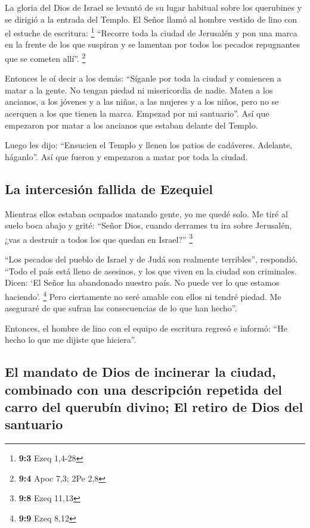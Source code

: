  La gloria del Dios de Israel se levantó de su lugar
habitual sobre los querubines y se dirigió a la entrada del Templo. El
Señor llamó al hombre vestido de lino con el estuche de escritura:
\footnote{\textbf{9:3} Ezeq 1,4-28}  ``Recorre toda la
ciudad de Jerusalén y pon una marca en la frente de los que suspiran y
se lamentan por todos los pecados repugnantes que se cometen allí''.
\footnote{\textbf{9:4} Apoc 7,3; 2Pe 2,8}

 Entonces le oí decir a los demás: ``Síganle por toda la
ciudad y comiencen a matar a la gente. No tengan piedad ni misericordia
de nadie.  Maten a los ancianos, a los jóvenes y a las
niñas, a las mujeres y a los niños, pero no se acerquen a los que tienen
la marca. Empezad por mi santuario''. Así que empezaron por matar a los
ancianos que estaban delante del Templo.

 Luego les dijo: ``Ensucien el Templo y llenen los patios
de cadáveres. Adelante, háganlo''. Así que fueron y empezaron a matar
por toda la ciudad.

\hypertarget{la-intercesiuxf3n-fallida-de-ezequiel}{%
\subsection{La intercesión fallida de
Ezequiel}\label{la-intercesiuxf3n-fallida-de-ezequiel}}

 Mientras ellos estaban ocupados matando gente, yo me
quedé solo. Me tiré al suelo boca abajo y grité: ``Señor Dios, cuando
derrames tu ira sobre Jerusalén, ¿vas a destruir a todos los que quedan
en Israel?'' \footnote{\textbf{9:8} Ezeq 11,13}

 ``Los pecados del pueblo de Israel y de Judá son
realmente terribles'', respondió. ``Todo el país está lleno de asesinos,
y los que viven en la ciudad son criminales. Dicen: `El Señor ha
abandonado nuestro país. No puede ver lo que estamos haciendo'.
\footnote{\textbf{9:9} Ezeq 8,12}  Pero ciertamente no
seré amable con ellos ni tendré piedad. Me aseguraré de que sufran las
consecuencias de lo que han hecho''.

 Entonces, el hombre de lino con el equipo de escritura
regresó e informó: ``He hecho lo que me dijiste que hiciera''.

\hypertarget{el-mandato-de-dios-de-incinerar-la-ciudad-combinado-con-una-descripciuxf3n-repetida-del-carro-del-querubuxedn-divino-el-retiro-de-dios-del-santuario}{%
\subsection{El mandato de Dios de incinerar la ciudad, combinado con una
descripción repetida del carro del querubín divino; El retiro de Dios
del
santuario}\label{el-mandato-de-dios-de-incinerar-la-ciudad-combinado-con-una-descripciuxf3n-repetida-del-carro-del-querubuxedn-divino-el-retiro-de-dios-del-santuario}}

